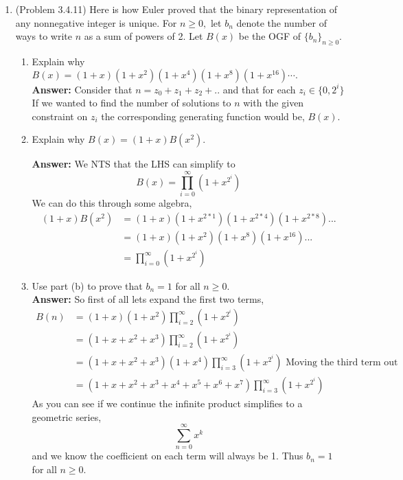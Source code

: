 \documentclass{amsart}
\begin{document}
\begin{enumerate}
\item (Problem 3.4.11) Here is how Euler proved that the binary representation of any nonnegative integer is unique. For $n \geq 0,$ let $b_n$ denote the number of ways to write $n$ as a sum of powers of 2. Let $B(x)$ be the OGF of $\{b_n\}_{n \geq 0}.$\\
	\begin{enumerate}
	\item Explain why $B(x)=(1+x)(1+x^2)(1+x^4)(1+x^8)(1+x^{16})\cdots.$\\
	\textbf{Answer:} Consider that $n = z_0+z_1+z_2+..$ and that for each $z_i \in \{0,2^i\}$ If we wanted to find the number of solutions to $n$ with the given constraint on $z_i$ the corresponding generating function would be, $B(x)$.
	\vspace{.5in}
	
	\item Explain why $B(x)=(1+x)B(x^2).$
	
	\textbf{Answer:} We NTS that the LHS can simplify to
	\begin{equation*}
	B(x) = \displaystyle{\prod_{i=0}^\infty (1+x^{2^i})}
	\end{equation*}
	We can do this through some algebra,
	\begin{align*}
	(1+x)B(x^2) &= (1+x)(1+x^{2*1})(1+x^{2*4})(1+x^{2*8})...\\
	&= (1+x)(1+x^{2})(1+x^{8})(1+x^{16})...\\
	&=\displaystyle{\prod_{i=0}^\infty (1+x^{2^i})} 
	\end{align*}

	\vspace{1in}
	
	\item Use part (b) to prove that $b_n=1$ for all $n \geq 0.$\\
	
	\textbf{Answer:} So first of all lets expand the first two terms,
	\begin{align*}
	B(n) &= (1+x)(1+x^2)\displaystyle{\prod_{i=2}^\infty (1+x^{2^i})} \\
	&= (1+x+x^2+x^3)\displaystyle{\prod_{i=2}^\infty (1+x^{2^i})}\\
	&= (1+x+x^2+x^3)(1+x^4)\displaystyle{\prod_{i=3}^\infty (1+x^{2^i})} \text{ Moving the third term out}\\
	&= (1+x+x^2+x^3+x^4+x^5+x^6+x^7)\displaystyle{\prod_{i=3}^\infty (1+x^{2^i})}
	\end{align*}
	As you can see if we continue the infinite product simplifies to a geometric series,
	\begin{equation*}
	\sum_{n=0}^{\infty} x^k
	\end{equation*}
	and we know the coefficient on each term will always be 1. Thus  $b_n=1$ for all $n \geq 0.$
	\vspace{1in}
	\end{enumerate}




\end{enumerate}
\end{document}
